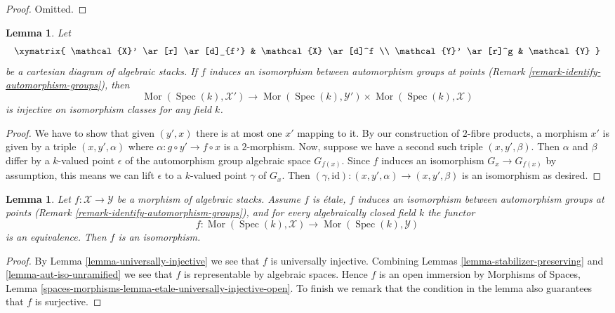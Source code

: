 \documentclass{stacks-project}
\theoremstyle{plain}
\newtheorem{lemma}[subsection]{Lemma}
\theoremstyle{definition}
\theoremstyle{remark}
\numberwithin{equation}{subsection}
\def\Spec{\mathop{\mathrm{Spec}}}
\def\Mor{\mathop{\mathrm{Mor}}\nolimits}
\begin{document}
\begin{proof}
Omitted.
\end{proof}

\begin{lemma}
\label{lemma-stabilizer-preserving-points-cartesian}
Let
$$
\xymatrix{
\mathcal{X}' \ar[r] \ar[d]_{f'} & \mathcal{X} \ar[d]^f \\
\mathcal{Y}' \ar[r]^g & \mathcal{Y}
}
$$
be a cartesian diagram of algebraic stacks. If $f$ induces an isomorphism
between automorphism groups at points
(Remark \ref{remark-identify-automorphism-groups}),
then
$$
\Mor(\Spec(k), \mathcal{X}')
\longrightarrow
\Mor(\Spec(k), \mathcal{Y}') \times \Mor(\Spec(k), \mathcal{X})
$$
is injective on isomorphism classes for any field $k$.
\end{lemma}

\begin{proof}
We have to show that given $(y', x)$ there is at most one $x'$
mapping to it.
By our construction of $2$-fibre products, a morphism
$x'$ is given by a triple $(x, y', \alpha)$
where  $\alpha : g \circ y' \to f \circ x$ is a $2$-morphism.
Now, suppose we have a second such triple $(x, y', \beta)$.
Then $\alpha$ and $\beta$ differ by a $k$-valued point
$\epsilon$ of the automorphism group algebraic space $G_{f(x)}$.
Since $f$ induces an isomorphism $G_x \to G_{f(x)}$ by
assumption, this means we can lift $\epsilon$ to a $k$-valued point
$\gamma$ of $G_x$. Then $(\gamma, \text{id}) : (x, y', \alpha) \to
(x, y', \beta)$ is an isomorphism as desired.
\end{proof}

\begin{lemma}
\label{lemma-etale-iso}
Let $f : \mathcal{X} \to \mathcal{Y}$ be a morphism of algebraic stacks.
Assume $f$ is \'etale, $f$ induces an isomorphism
between automorphism groups at points
(Remark \ref{remark-identify-automorphism-groups}),
and for every algebraically closed field $k$ the functor
$$
f : \Mor(\Spec(k), \mathcal{X}) \longrightarrow \Mor(\Spec(k), \mathcal{Y})
$$
is an equivalence. Then $f$ is an isomorphism.
\end{lemma}

\begin{proof}
By Lemma \ref{lemma-universally-injective} we see that $f$ is
universally injective. Combining
Lemmas \ref{lemma-stabilizer-preserving} and
\ref{lemma-aut-iso-unramified}
we see that $f$ is representable by algebraic spaces.
Hence $f$ is an open immersion by Morphisms of Spaces, Lemma
\ref{spaces-morphisms-lemma-etale-universally-injective-open}.
To finish we remark that the condition in the lemma also guarantees
that $f$ is surjective.
\end{proof}
\end{document}
